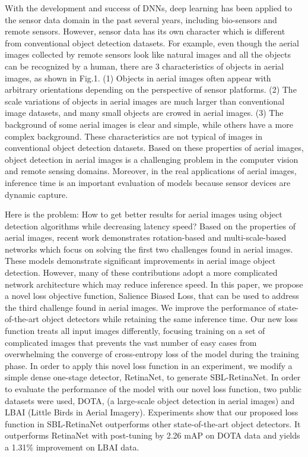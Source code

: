 \documentclass[conference]{IEEEtran}
\begin{document}
    
    
    With the development and success of DNNs, deep learning has been applied to the sensor data domain in the past several years, including bio-sensors\cite{sun2016ada,bernstein2017using} and remote sensors\cite{chen2017automatic,tang2017vehicle,sommer2017deep,xia2018dota,yang2018automatic}. However, sensor data has its own character which is different from conventional object detection datasets. For example, even though the aerial images collected by remote sensors look like natural images and all the objects can be recognized by a human, there are 3 characteristics of objects in aerial images, as shown in Fig.1. (1) Objects in aerial images often appear with arbitrary orientations depending on the perspective of sensor platforms. (2) The scale variations of objects in aerial images are much larger than conventional image datasets, and many small objects are crowed in aerial images. (3) The background of some aerial images is clear and simple, while others have a more complex background. These characteristics are not typical of images in conventional object detection datasets. Based on these properties of aerial images, object detection in aerial images is a challenging problem in the computer vision and remote sensing domains. Moreover, in the real applications of aerial images, inference time is an important evaluation of models because sensor devices are dynamic capture.  
    
    Here is the problem: How to get better results for aerial images using object detection algorithms while decreasing latency speed? Based on the properties of aerial images, recent work demonstrates rotation-based\cite{li2018multiscale,azimi2018towards} and multi-scale-based networks\cite{li2018multiscale,li2018r} which focus on solving the first two challenges found in aerial images. These models demonstrate significant improvements in aerial image object detection. However, many of these contributions adopt a more complicated network architecture which may reduce inference speed. In this paper, we propose a novel loss objective function, Salience Biased Loss, that can be used to address the third challenge found in aerial images. We improve the performance of state-of-the-art object detectors while retaining the same inference time. Our new loss function treats all input images differently, focusing training on a set of complicated images that prevents the vast number of easy cases from overwhelming the converge of cross-entropy loss of the model during the training phase. In order to apply this novel loss function in an experiment, we modify a simple dense one-stage detector, RetinaNet\cite{lin2017focal}, to generate SBL-RetinaNet. In order to evaluate the performance of the model with our novel loss function, two public datasets were used, DOTA\cite{xia2018dota}, (a large-scale object detection in aerial images) and LBAI\cite{liu2018performance} (Little Birds in Aerial Imagery). Experiments show that our proposed loss function in SBL-RetinaNet outperforms other state-of-the-art object detectors. It outperforms RetinaNet with post-tuning\cite{lin2017focal} by 2.26 mAP on DOTA data and yields a 1.31\% improvement on LBAI data. 
    
\end{document}
